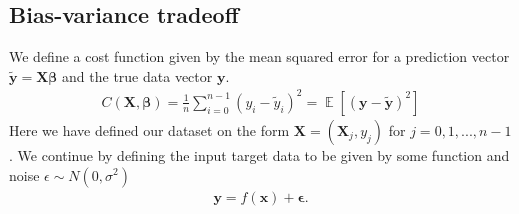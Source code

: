 \documentclass[11pt]{article}
\DeclareMathOperator*{\E}{\mathbb{E}}
\begin{document}
\subsection*{Bias-variance tradeoff}
We define a cost function given by the mean squared error for a prediction vector $\tilde{\boldsymbol{y}}= \boldsymbol{X} \boldsymbol{\beta}$ and the true data vector $\boldsymbol{y}$.
\begin{align*}
    C(\boldsymbol{X}, \boldsymbol{\beta}) = \frac{1 }{n }\sum_ {i=0}^{n-1}(y_i - \tilde{y}_i)^2 = \E[(\boldsymbol{y}- \boldsymbol{\tilde{y}})^2]
\end{align*}
Here we have defined our dataset on the form $\boldsymbol{X} = (\boldsymbol{X}_j, y_j)$ for $j= 0, 1, ..., n-1$.
We continue by defining the input target data to be given by some function and noise $\epsilon\sim N(0, \sigma^2)$
\begin{align*}
    \boldsymbol{y} = f(\boldsymbol{x}) + \boldsymbol{\epsilon}.
\end{align*}
\end{document}
